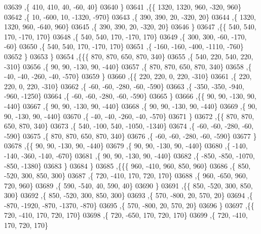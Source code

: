 \begin{DoxyCode}
03639     ,\{   410,   410,    40,   -60,    40\}
03640     \}
03641    ,\{\{  1320,  1320,   960,  -320,   960\}
03642     ,\{    10,  -600,    10, -1320,  -970\}
03643     ,\{   390,   390,    20,  -320,    20\}
03644     ,\{  1320,  1320,   960,  -640,   960\}
03645     ,\{   390,   390,    20,  -320,    20\}
03646     \}
03647    ,\{\{   540,   540,   170,  -170,   170\}
03648     ,\{   540,   540,   170,  -170,   170\}
03649     ,\{   300,   300,   -60,  -170,   -60\}
03650     ,\{   540,   540,   170,  -170,   170\}
03651     ,\{  -160,  -160,  -400, -1110,  -760\}
03652     \}
03653    \}
03654   ,\{\{\{   870,   870,   650,   870,   340\}
03655     ,\{   540,   220,   540,   220,  -310\}
03656     ,\{    90,    90,  -130,    90,  -440\}
03657     ,\{   870,   870,   650,   870,   340\}
03658     ,\{   -40,   -40,  -260,   -40,  -570\}
03659     \}
03660    ,\{\{   220,   220,     0,   220,  -310\}
03661     ,\{   220,   220,     0,   220,  -310\}
03662     ,\{   -60,   -60,  -280,   -60,  -590\}
03663     ,\{  -350,  -350,  -940,  -960, -1250\}
03664     ,\{   -60,   -60,  -280,   -60,  -590\}
03665     \}
03666    ,\{\{    90,    90,  -130,    90,  -440\}
03667     ,\{    90,    90,  -130,    90,  -440\}
03668     ,\{    90,    90,  -130,    90,  -440\}
03669     ,\{    90,    90,  -130,    90,  -440\}
03670     ,\{   -40,   -40,  -260,   -40,  -570\}
03671     \}
03672    ,\{\{   870,   870,   650,   870,   340\}
03673     ,\{   540,  -100,   540, -1050, -1340\}
03674     ,\{   -60,   -60,  -280,   -60,  -590\}
03675     ,\{   870,   870,   650,   870,   340\}
03676     ,\{   -60,   -60,  -280,   -60,  -590\}
03677     \}
03678    ,\{\{    90,    90,  -130,    90,  -440\}
03679     ,\{    90,    90,  -130,    90,  -440\}
03680     ,\{  -140,  -140,  -360,  -140,  -670\}
03681     ,\{    90,    90,  -130,    90,  -440\}
03682     ,\{  -850,  -850, -1070,  -850, -1380\}
03683     \}
03684    \}
03685   ,\{\{\{   960,  -410,   960,   850,   960\}
03686     ,\{   850,  -520,   300,   850,   300\}
03687     ,\{   720,  -410,   170,   720,   170\}
03688     ,\{   960,  -650,   960,   720,   960\}
03689     ,\{   590,  -540,    40,   590,    40\}
03690     \}
03691    ,\{\{   850,  -520,   300,   850,   300\}
03692     ,\{   850,  -520,   300,   850,   300\}
03693     ,\{   570,  -800,    20,   570,    20\}
03694     ,\{  -870, -1920,  -870, -1370,  -870\}
03695     ,\{   570,  -800,    20,   570,    20\}
03696     \}
03697    ,\{\{   720,  -410,   170,   720,   170\}
03698     ,\{   720,  -650,   170,   720,   170\}
03699     ,\{   720,  -410,   170,   720,   170\}

\end{DoxyCode}
